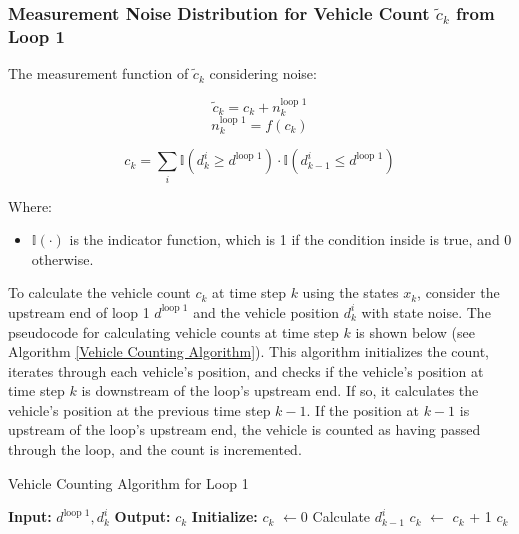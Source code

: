 \subsubsection{Measurement Noise Distribution for Vehicle Count $\tilde c_k$ from Loop 1}
The measurement function of $\tilde c_k$ considering noise:

\begin{equation}
    \tilde c_k = c_k + n_k^\text{loop 1}
\end{equation}
\begin{equation}
    n_k^\text{loop 1} = f(c_k)
\end{equation}

\begin{equation}\label{VehicleCounting}
c_k = \sum_{i} \mathbb{I}(d_{k}^i \geq d^{\text{loop 1}}) \cdot \mathbb{I}(d_{k-1}^i \leq d^{\text{loop 1}})
\end{equation}

Where:
\begin{itemize}
    \item \(\mathbb{I}(\cdot)\) is the indicator function, which is 1 if the condition inside is true, and 0 otherwise.
\end{itemize}


To calculate the vehicle count \(c_k\) at time step \(k\) using the states \(x_k\), consider the upstream end of loop 1 \(d^{\text{loop 1}}\) and the vehicle position \(d_k^i\) with state noise. The pseudocode for calculating vehicle counts at time step \(k\) is shown below (see Algorithm \ref{Vehicle Counting Algorithm}). This algorithm initializes the count, iterates through each vehicle's position, and checks if the vehicle's position at time step \(k\) is downstream of the loop's upstream end. If so, it calculates the vehicle's position at the previous time step \(k-1\). If the position at \(k-1\) is upstream of the loop's upstream end, the vehicle is counted as having passed through the loop, and the count is incremented.

\begin{algorithm}[htp]
\caption{Vehicle Counting Algorithm for Loop 1}\label{Vehicle Counting Algorithm}
\begin{algorithmic}[1]
    \State \textbf{Input:} $d^{\text{loop 1}}, d_{k}^i$
    \State \textbf{Output:} $c_k$
    \State \textbf{Initialize:} $c_k$ $\gets 0$
            \State Calculate $ d_{k-1}^i$
                \State $c_k$ $\gets$ $c_k$ + 1
            \EndIf
        \EndIf
    \EndFor
    \State \Return $c_k$
\end{algorithmic}
\end{algorithm}  


